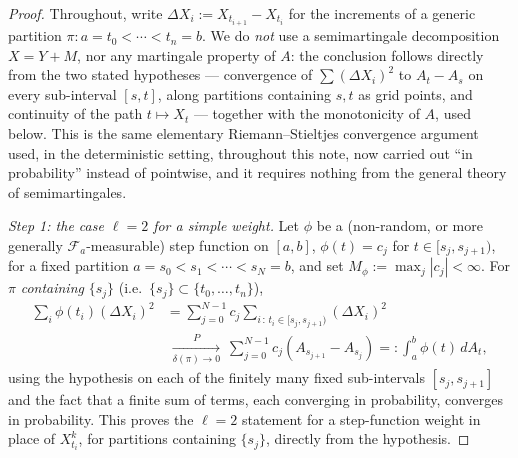 \documentclass[11pt,fleqn]{article}
\theoremstyle{plain}
\theoremstyle{remark}
\begin{document}
\begin{proof}
Throughout, write $\Delta X_i:=X_{t_{i+1}}-X_{t_i}$ for the increments of a
generic partition $\pi\colon a=t_0<\cdots<t_n=b$. We do \emph{not} use a
semimartingale decomposition $X=Y+M$, nor any martingale property of $A$:
the conclusion follows directly from the two stated hypotheses ---
convergence of $\sum(\Delta X_i)^2$ to $A_t-A_s$ on every sub-interval
$[s,t]$, along partitions containing $s,t$ as grid points, and continuity
of the path $t\mapsto X_t$ --- together with the
monotonicity of $A$, used below. This is the same elementary
Riemann--Stieltjes convergence argument used, in the deterministic
setting, throughout this note, now carried out ``in probability'' instead
of pointwise, and it requires nothing from the general theory of
semimartingales.

\medskip\noindent\textit{Step 1: the case $\ell=2$ for a simple weight.}
Let $\phi$ be a (non-random, or more generally $\mathcal F_a$-measurable)
step function on $[a,b]$, $\phi(t)=c_j$ for $t\in[s_j,s_{j+1})$, for a
fixed partition $a=s_0<s_1<\cdots<s_N=b$, and set
$M_\phi:=\max_j|c_j|<\infty$. For $\pi$ \emph{containing} $\{s_j\}$
(i.e.\ $\{s_j\}\subset\{t_0,\ldots,t_n\}$),
\begin{align*}
\sum_i\phi(t_i)(\Delta X_i)^2&=\sum_{j=0}^{N-1}c_j\!\!
\sum_{i\,:\,t_i\in[s_j,s_{j+1})}\!\!(\Delta X_i)^2\\
&\ \xrightarrow[\delta(\pi)\to0]{P}\ \sum_{j=0}^{N-1}c_j(A_{s_{j+1}}-A_{s_j})
=:\int_a^b\phi(t)\,dA_t,
\end{align*}
using the hypothesis on each of the finitely many fixed sub-intervals
$[s_j,s_{j+1}]$ and the fact that a finite sum of terms, each converging
in probability, converges in probability. This proves the $\ell=2$
statement for a step-function weight in place of $X_{t_i}^k$, for
partitions containing $\{s_j\}$, directly from the hypothesis.


\end{proof}
\end{document}
